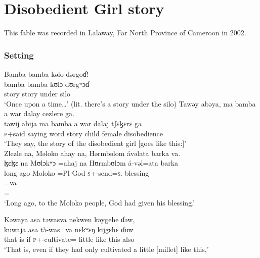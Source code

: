 \section[Disobedient Girl story]{Disobedient Girl story\\\hspace{1.5em} \textnormal{}}\setcounter{equation}{0}
\hypertarget{RefHeading1210341525720847}{}\label{sec:1.5}
This fable was recorded in Lalaway, Far North Province of Cameroon in 2002. 

\subsubsection*{Setting}
\ea Bamba  bamba  kəlo  dərgoɗ!\\
\gll bamba   bamba   kʊlɔ     dʊrgʷɔɗ\\
story        story     under    silo\\
\glt ‘Once upon a time…’ (lit. there’s a story under the silo)
\z
\ea    Tawəy  abəya,  ma  bamba  a  war  dalay  cezlere  ga.\\
\gll tawij  abija    ma   bamba   a       war     dalaj      tʃɛɮɛrɛ        ga\\
\textsc{p}+said  saying   word   story   {\GEN}   child   female  disobedience   {\ADJ}\\
\glt ‘They say, the story of the disobedient girl [goes like this:]’\\
\z
\ea    Zlezle  na,  Məloko  ahay  na,  Hərmbəlom  ávəlata  barka  va.\\
\gll ɮɛɮɛ        na  Mʊlɔkʷɔ  =ahaj     na  Hʊrmbʊlɔm  á-vəl=ata     barka\\   
{long ago}         {\PSP}  Moloko   =Pl          {\PSP}  God       \textsc{s}+{\IFV}-send=\textsc{s}.{\IO}   blessing \\ 

\medskip
\gll  =va\\
     ={\PRF}\\
\glt ‘Long ago, to the Moloko people, God had given his blessing.’\\
\z

\clearpage
\ea Kəwaya  asa  təwasva  nekwen  kəygehe  ɗəw,\\
\gll kuwaja   asa    t\`ə-was=va  nɛkʷɛŋ    kijgɛhɛ     ɗuw\\
{that is}   if     \textsc{p}+{\PFV}-cultivate={\PRF}  little       {like this}    also\\
\glt ‘That is, even if they had only cultivated a little [millet] like this,’\\

